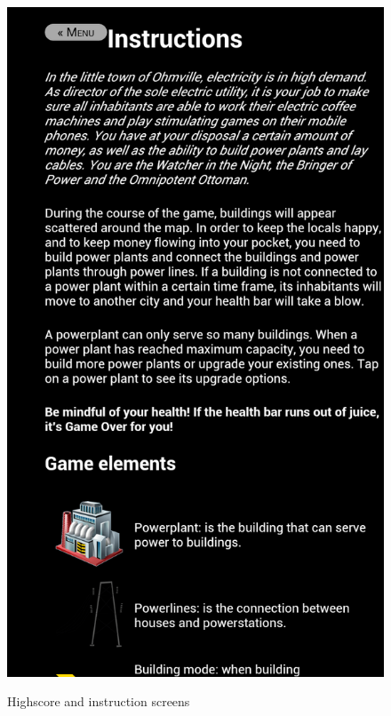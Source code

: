 \begin{figure}[H]
{		\includegraphics[scale=0.18]{pictures/sprint4-screen/instructions}
	}
	\caption{Highscore and instruction screens}
\end{figure}


